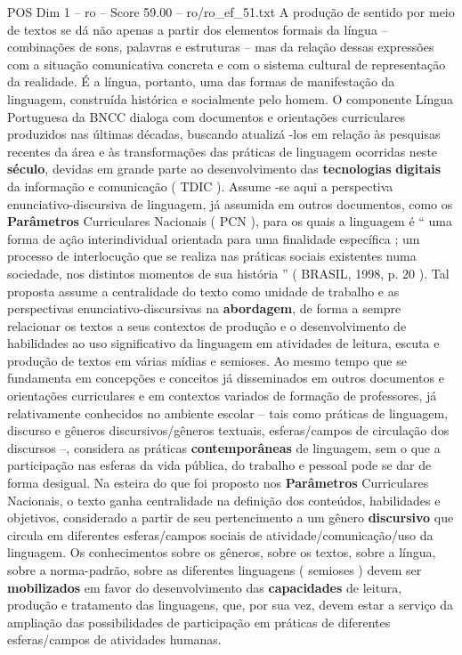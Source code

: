 \begin{textsample}{POS Dim 1 – ro – Score 59.00 – ro/ro\_ef\_51.txt}
A produção de sentido por meio de textos se dá não apenas a partir dos elementos formais da língua – combinações de sons, palavras e estruturas – mas da relação dessas expressões com a situação comunicativa concreta e com o sistema cultural de representação da realidade.
É a língua, portanto, uma das formas de manifestação da linguagem, construída histórica e socialmente pelo homem.
O componente Língua Portuguesa da BNCC dialoga com documentos e orientações curriculares produzidos nas últimas décadas, buscando atualizá -los em relação às pesquisas recentes da área e às transformações das práticas de linguagem ocorridas neste \textbf{século}, devidas em grande parte ao desenvolvimento das \textbf{tecnologias} \textbf{digitais} da informação e comunicação ( TDIC ).
Assume -se aqui a perspectiva enunciativo-discursiva de linguagem, já assumida em outros documentos, como os \textbf{Parâmetros} Curriculares Nacionais ( PCN ), para os quais a linguagem é “ uma forma de ação interindividual orientada para uma finalidade específica ; um processo de interlocução que se realiza nas práticas sociais existentes numa sociedade, nos distintos momentos de sua história ” ( BRASIL, 1998, p. 20 ).
Tal proposta assume a centralidade do texto como unidade de trabalho e as perspectivas enunciativo-discursivas na \textbf{abordagem}, de forma a sempre relacionar os textos a seus contextos de produção e o desenvolvimento de habilidades ao uso significativo da linguagem em atividades de leitura, escuta e produção de textos em várias mídias e semioses.
Ao mesmo tempo que se fundamenta em concepções e conceitos já disseminados em outros documentos e orientações curriculares e em contextos variados de formação de professores, já relativamente conhecidos no ambiente escolar – tais como práticas de linguagem, discurso e gêneros discursivos/gêneros textuais, esferas/campos de circulação dos discursos –, considera as práticas \textbf{contemporâneas} de linguagem, sem o que a participação nas esferas da vida pública, do trabalho e pessoal pode se dar de forma desigual.
Na esteira do que foi proposto nos \textbf{Parâmetros} Curriculares Nacionais, o texto ganha centralidade na definição dos conteúdos, habilidades e objetivos, considerado a partir de seu pertencimento a um gênero \textbf{discursivo} que circula em diferentes esferas/campos sociais de atividade/comunicação/uso da linguagem.
Os conhecimentos sobre os gêneros, sobre os textos, sobre a língua, sobre a norma-padrão, sobre as diferentes linguagens ( semioses ) devem ser \textbf{mobilizados} em favor do desenvolvimento das \textbf{capacidades} de leitura, produção e tratamento das linguagens, que, por sua vez, devem estar a serviço da ampliação das possibilidades de participação em práticas de diferentes esferas/campos de atividades humanas.

\end{textsample}

